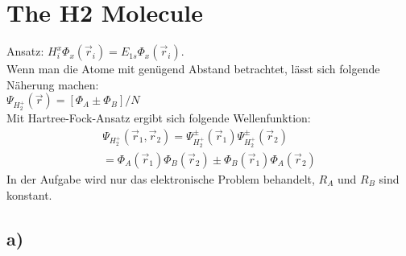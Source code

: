 \section{The H2 Molecule}

Ansatz: $H_i^x \Phi_x \left(\vec{r}_i \right) = E_{1s} \Phi_x \left(\vec{r}_i \right)$.\\
Wenn man die Atome mit gen\"ugend Abstand betrachtet, l\"asst sich folgende N\"aherung machen:\\
$\Psi_{H_2^+} \left(\vec{r} \right) = \left[\Phi_A \pm \Phi_B \right] / N$\\
Mit Hartree-Fock-Ansatz ergibt sich folgende Wellenfunktion:
\begin{align}
\Psi_{H_2^+} \left(\vec{r}_1,\vec{r}_2 \right) = \Psi_{H_2^+}^{\pm} \left(\vec{r}_1\right) \Psi_{H_2^+}^{\pm} \left(\vec{r}_2\right) \\
= \Phi_A \left(\vec{r}_1\right) \Phi_B \left(\vec{r}_2\right)  \pm \Phi_B \left(\vec{r}_1\right) \Phi_A \left(\vec{r}_2\right)
\end{align}
In der Aufgabe wird nur das elektronische Problem behandelt, $R_A$ und $R_B$ sind konstant.

\subsection{a)}

